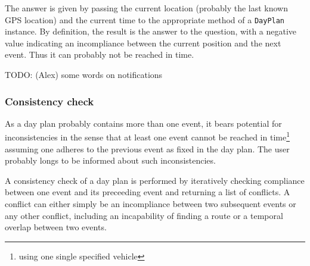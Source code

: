 The answer is given by passing the current location (probably the last known GPS location) and the current time to the appropriate method of a \texttt{DayPlan} instance. By definition, the result is the answer to the question, with a negative value indicating an incompliance between the current position and the next event. Thus it can probably not be reached in time.

TODO: (Alex) some words on notifications

\subsubsection{Consistency check}

As a day plan probably contains more than one event, it bears potential for inconsistencies in the sense that at least one event cannot be reached in time\footnote{using one single specified vehicle} assuming one adheres to the previous event as fixed in the day plan. The user probably longs to be informed about such inconsistencies.\newline

A consistency check of a day plan is performed by iteratively checking compliance between one event and its preceeding event and returning a list of conflicts. A conflict can either simply be an incompliance between two subsequent events or any other conflict, including an incapability of finding a route or a temporal overlap between two events.











